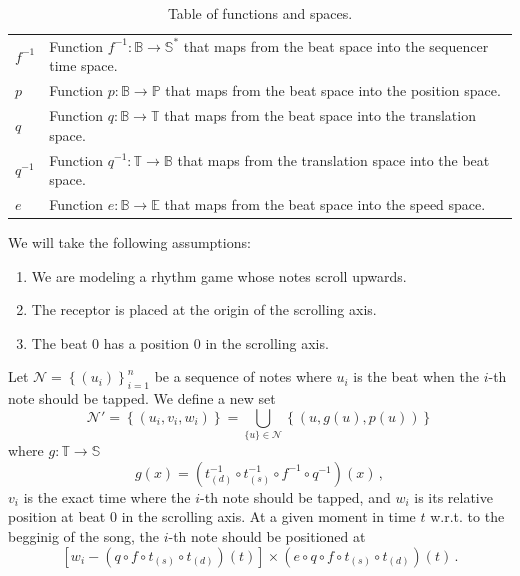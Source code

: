 \documentclass[a4paper,9pt]{article}
\begin{document}
\begin{table}[htbp]
\begin{tabular}{lp{11cm}}
		    $ f^{-1} $ & Function $ f^{-1}: \mathbb{B}\rightarrow \mathbb{S^{*}} $ that maps from the beat space into the sequencer time space.\\
		    $ p $ & Function $ p: \mathbb{B}\rightarrow \mathbb{P} $ that maps from the beat space into the position space.\\
		    $ q $ & Function $ q: \mathbb{B}\rightarrow \mathbb{T} $ that maps from the beat space into the translation space.\\
		    $ q^{-1} $ & Function $ q^{-1}: \mathbb{T}\rightarrow \mathbb{B} $ that maps from the translation space into the beat space.\\
		    $ e $ & Function $ e: \mathbb{B}\rightarrow \mathbb{E} $ that maps from the beat space into the speed space.\\
		    \bottomrule
	    \end{tabular}
	    \caption{Table of functions and spaces.}
	    \label{tab:symbol-table}
    \end{table}

    We will take the following assumptions:
    \begin{enumerate}
	    \item We are modeling a rhythm game whose notes scroll upwards.
	    \item The receptor is placed at the origin of the scrolling axis.
	    \item The beat 0 has a position 0 in the scrolling axis.
    \end{enumerate}

    Let $ \mathcal{N} =  \left\{ \left( u_{i} \right) \right\}_{i=1}^{n} $ be a sequence of notes where $ u_{i} $ is the beat when the $ i $-th note should be tapped. We define a new set 
    \begin{equation}
	    \mathcal{N'} = \left\{ \left( u_{i}, v_i, w_i \right) \right\} = \bigcup_{\{u\}\in \mathcal{N}} \left\{ \left(u, g(u), p(u) \right) \right\}
	    \label{eq:set}
    \end{equation}
    where $ g: \mathbb{T}\rightarrow \mathbb{S} $
    \begin{equation}
	    g(x) = \left( t_{(d)}^{-1}\circ t_{(s)}^{-1}\circ f^{-1}\circ q^{-1} \right)(x)\,,
	    \label{eq:final-g}
    \end{equation}
    $ v_i $ is the exact time where the $ i $-th note should be tapped, and $ w_i $ is its relative position at beat 0 in the scrolling axis.
    At a given moment in time $ t $ w.r.t. to the begginig of the song, the $ i $-th note should be positioned at
    \begin{equation}
	    \left[ w_i - \left( q\circ f\circ t_{(s)}\circ t_{(d)} \right)(t) \right] \times \left( e\circ q\circ f\circ t_{(s)}\circ t_{(d)} \right)(t)\,.
	    \label{eq:final-position}
    \end{equation}
\end{document}
